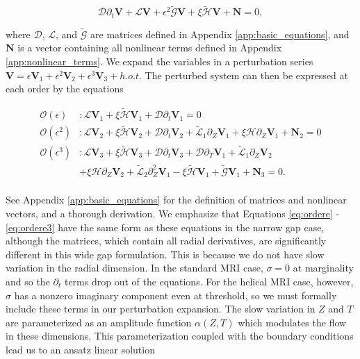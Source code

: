 \documentclass{emulateapj}
\newcommand{\beq}{\begin{equation}}
\newcommand{\eeq}{\end{equation}}
\begin{document}
\beq\label{eq:unperturbed_matrix_eqns}
\mathcal{D}\partial_t\mathbf{V} + \mathcal{L}\mathbf{V} + \epsilon^2 \widetilde{\mathcal{G}} \mathbf{V} + \xi \widetilde{\mathcal{H}} \mathbf{V} +  \mathbf{N} = 0,
\eeq

where $\mathcal{D}$, $\mathcal{L}$, and $\widetilde{\mathcal{G}}$ are matrices defined in Appendix \ref{app:basic_equations}, and $\mathbf{N}$ is a vector containing all nonlinear terms defined in Appendix \ref{app:nonlinear_terms}. We expand the variables in a perturbation series $\mathbf{V} = \epsilon \mathbf{V}_1 + \epsilon^2 \mathbf{V}_2 + \epsilon^3 \mathbf{V}_3 + h.o.t.$ The perturbed system can then be expressed at each order by the equations

\begin{align}
\mathcal{O}(\epsilon)&: \mathcal{L} \mathbf{V}_1 + \xi \widetilde{\mathcal{H}} \mathbf{V}_1 + \mathcal{D} \partial_t \mathbf{V}_1 = 0 \label{eq:ordere}\\
\mathcal{O}(\epsilon^2)&: \mathcal{L} \mathbf{V}_2 + \xi \widetilde{\mathcal{H}} \mathbf{V}_2 + \mathcal{D} \partial_t \mathbf{V}_2 + \widetilde{\mathcal{L}}_1 \partial_Z \mathbf{V}_1 + \xi \mathcal{H} \partial_Z \mathbf{V}_1 + \mathbf{N}_2 = 0 \label{eq:ordere2}\\
\mathcal{O}(\epsilon^3)&: \mathcal{L}\mathbf{V}_3 + \xi \widetilde{\mathcal{H}} \mathbf{V}_3 + \mathcal{D} \partial_t \mathbf{V}_3 + \mathcal{D} \partial_T \mathbf{V}_1 + \widetilde{\mathcal{L}}_1 \partial_Z \mathbf{V}_2\nonumber \\ 
&+ \xi \mathcal{H}\partial_Z \mathbf{V}_2 + \widetilde{\mathcal{L}}_2 \partial_Z^2 \mathbf{V}_1 - \xi \widetilde{\mathcal{H}} \mathbf{V}_1 + \widetilde{\mathcal{G}} \mathbf{V}_1 + \mathbf{N}_3 = 0. \label{eq:ordere3}\\
\end{align}

See Appendix \ref{app:basic_equations} for the definition of matrices and nonlinear vectors, and a thorough derivation. We emphasize that Equations \ref{eq:ordere} - \ref{eq:ordere3} have the same form as these equations in the narrow gap case, although the matrices, which contain all radial derivatives, are significantly different in this wide gap formulation. This is because we do not have slow variation in the radial dimension. In the standard MRI case, $\sigma = 0$ at marginality and so the $\partial_t$ terms drop out of the equations. For the helical MRI case, however, $\sigma$ has a nonzero imaginary component even at threshold, so we must formally include these terms in our perturbation expansion. The slow variation in $Z$ and $T$ are parameterized as an amplitude function $\alpha(Z, T)$ which modulates the flow in these dimensions. This parameterization coupled with the boundary conditions lead us to an ansatz linear solution 
\end{document}
